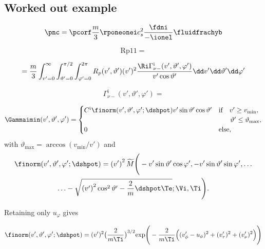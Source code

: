 \subsection{Worked out example}

\begin{equation}
    \pnc = \pcorf \frac{m}{3} \rponeonei c_s^2 \frac{\fdni}{-\ionel} \fluidfrachyb
\end{equation}

\begin{equation}
    \mathrm{Rp11} =
\end{equation}

\begin{equation}
 = \frac{m}{3} \int_{v'=0}^{\infty} \int_{\vartheta'=0}^{\pi/2} \int_{\varphi'=0}^{2\pi}
 R_{p}(v',\vartheta') (v')^{2}  \frac{ \Ri \Gamma_{\nu-}^{\mathrm{i}}(v',\vartheta',\varphi')}{v' \cos \vartheta'}  \dd v' \dd \vartheta' \dd \varphi'  \label{eq:temp1}
\end{equation}

\begin{equation}
    \Gamma_{\nu-}^{\mathrm{i}}(v',\vartheta',\varphi') =
\end{equation}

\begin{equation}
\Gammaimin(v',\vartheta',\varphi') = \begin{cases} C^{\mathrm{i}} \finorm(v',\vartheta',\varphi';\dshpot) v' \sin \vartheta' \cos \vartheta' & \text{if} \quad v' \geq v_{\mathrm{min}}, \\
& \hspace{0.6cm} \vartheta' \leq \vartheta_{\mathrm{max}}, \\
0 & \text{else}, \end{cases} \label{eq:fib}
\end{equation}
with $\vartheta_{\mathrm{max}} = \arccos (v_{\mathrm{min}}/v')$ and
\begin{multline}
\finorm(v',\vartheta',\varphi';\dshpot) = \left (v' \right )^{2} \widetilde{M} \Bigg (-v' \sin \vartheta' \cos \varphi',-v' \sin \vartheta' \sin \varphi', \ldots \\
\ldots -\sqrt{\left (v'\right )^{2} \cos^{2} \vartheta' -\frac{2}{m} \dshpot \Te};\Vi,\Ti \Bigg ). \label{eq:temp3}
\end{multline}

Retaining only $u_{\varphi}$ gives

\begin{equation}
\finorm(v',\vartheta',\varphi';\dshpot) = (v')^{2} \big( \frac{2}{m \Ti}\big)^{3/2} \mathrm{exp} \Bigg( - \frac{2}{m \Ti} \Big( (v'_{\phi} - u_\phi )^2 + (v'_\tau)^2 + (v'_\nu)^2 \Big)\Bigg)
\label{eq:temp3}
\end{equation}


